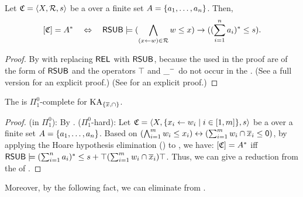 \begin{lemma}\label{lemma: CFG and LANG}
    Let $\mathfrak{C} = \langle X, \mathcal{R}, s\rangle$ be a  over a finite set $A = \{a_1, \dots, a_n\}$.
    Then,
    \[[ \mathfrak{C} ] = A^* \quad\Leftrightarrow\quad \mathsf{RSUB} \models (\bigwedge_{(x \leftarrow w) \in \mathcal{R}} w \le x) \to ((\sum_{i = 1}^{n} a_i)^* \le s).\]
\end{lemma}
\begin{proof}
    By \cite[Lem.\ 47]{nakamuraExistentialCalculiRelations2023} with replacing $\mathsf{REL}$ with $\mathsf{RSUB}$, because the  used in the proof are of the form of $\mathsf{RSUB}$ and the operators $\top$ and $\_^{-}$ do not occur in the .
    \ifiscameraready
    (See a full version \cite{nakamuraFiniteRelationalSemantics2024} for an explicit proof.)
    \else
    (See  for an explicit proof.)
    \fi
\end{proof}
\begin{theorem}\label{theorem: Pi01-complete}
    The  is $\Pi^{0}_{1}$-complete for $\mathrm{KA}_{\{\overline{x}, \cap\}}$.
\end{theorem}
\begin{proof}
    (in $\Pi^{0}_{1}$):
    By .
    ($\Pi^{0}_{1}$-hard):
    Let $\CFG = \tuple{X, \set{x_i \leftarrow \word_i \mid i \in \range{1, m}}, s}$ be a  over a finite set $A = \{a_1, \dots, a_n\}$.
    Based on $(\bigwedge_{i = 1}^{m} w_i \le x_i) \leftrightarrow (\sum_{i = 1}^{m} w_i \cap \overline{x}_i \le \mathsf{0})$,
    by applying the Hoare hypothesis elimination () to ,
    we have:
    $[ \mathfrak{C} ] = A^*$ iff $\mathsf{RSUB} \models (\sum_{i = 1}^{n} a_i)^* \le s \mathbin{+} \top (\sum_{i = 1}^{m} w_i \cap \overline{x}_i) \top$.
    Thus, we can give a reduction from the  of .
\end{proof}
Moreover, by the following fact, we can eliminate  from .
